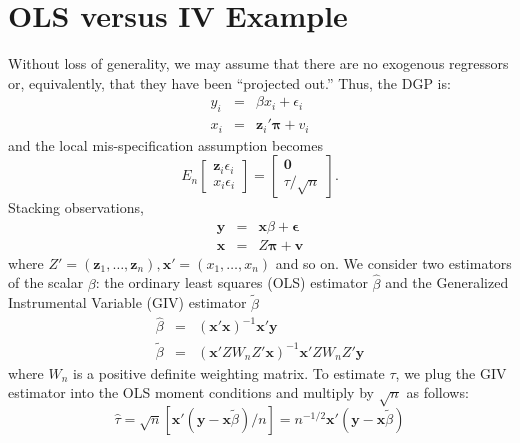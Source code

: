 \documentclass[12pt]{article}
\theoremstyle{definition}
\begin{document}
\section{OLS versus IV Example}
Without loss of generality, we may assume that there are no exogenous regressors or, equivalently, that they have been ``projected out.'' Thus, the DGP is: 
    	\begin{eqnarray}
			y_{i} &=& \beta x_{i}  + \epsilon_{i}\\
	x_{i} &=& \mathbf{z}_{i}' \boldsymbol{\pi} + v_{i}
		\end{eqnarray}
and the local mis-specification assumption becomes
  \begin{equation}
    E_n \left[\begin{array}{c} \mathbf{z}_i \epsilon_i \\ x_i \epsilon_i \end{array}\right] = \left[\begin{array}{c} \mathbf{0} \\ \tau/\sqrt{n} \end{array}\right].
  \end{equation}
Stacking observations,
\begin{eqnarray}
    \mathbf{y} &=& \mathbf{x}\beta + \boldsymbol{\epsilon}\\
    \mathbf{x} &=& Z\boldsymbol{\pi} + \mathbf{v}
\end{eqnarray}
where $Z' = (\mathbf{z}_{1}, \hdots, \mathbf{z}_{n}), \mathbf{x}' = (x_{1}, \hdots, x_{n})$ and so on. We consider two estimators of the scalar $\beta$: the ordinary least squares (OLS) estimator $\widehat{\beta}$ and the Generalized Instrumental Variable (GIV) estimator $\widetilde{\beta}$
  \begin{eqnarray}
		\widehat{\beta} &=& \left(\mathbf{x}'\mathbf{x}\right)^{-1}\mathbf{x}'\mathbf{y}\\
		\widetilde{\beta} &=& \left(\mathbf{x}'Z W_n Z'\mathbf{x}\right)^{-1}\mathbf{x}'Z W_nZ'\mathbf{y}
	\end{eqnarray}
where $W_n$ is a positive definite weighting matrix. To estimate $\tau$, we plug the GIV estimator into the OLS moment conditions and multiply by $\sqrt{n}$ as follows:
  \begin{equation}
     \widehat{\tau} = \sqrt{n} \left[\mathbf{x}'(\mathbf{y} - \mathbf{x}\widetilde{\beta})/n\right] = n^{-1/2}\mathbf{x}'(\mathbf{y} - \mathbf{x}\widetilde{\beta})
   \end{equation} 
\end{document}
